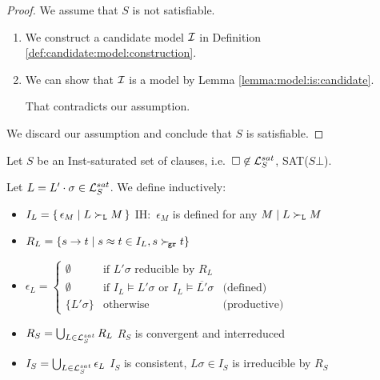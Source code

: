         \begin{proof} We assume that \(S\) is not satisfiable.
            \begin{enumerate}
                \item We construct a candidate model \(\mathcal{I}\) in Definition \vref{def:candidate:model:construction}.
                \item We can show that \(\mathcal{I}\) is a model by Lemma \vref{lemma:model:is:candidate}.

                That contradicts our assumption.
            \end{enumerate}
            We discard our assumption and conclude that \(S\) is satisfiable.
            \end{proof}

    \begin{definition}\label{def:candidate:model:construction}

        Let \(S\) be an Inst-saturated set of clauses,
        i.e.~\(\square\not\in\mathcal{L}_S^{sat}\), SAT(\(S\bot\)).

        Let \(L = L'\cdot\sigma \in\mathcal{L}_S^{sat}\).
        We define inductively:

            \begin{itemize}
                \item \(I_L = \{\,\epsilon_M\mid L\mathrel\succ_{\mathtt{L}} M\,\}\)
                \hfill  IH:~\(\epsilon_M\) is defined for any \(M\mid L\mathrel\succ_{\mathtt{L}} M\)

                \item \(R_L = \{ s \to t \mid s\approx t\in I_L, s\mathrel\succ_{\!\mathtt{gr}} t \}\)

                    \item \( \epsilon_L = \left\{
                        \begin{array}{cll}
                            \emptyset &\text{if }
                            L'\sigma\text{ reducible by }R_L
                            \\
                            \emptyset &\text{if }
                            I_L\vDash L'\sigma
                            \text{ or }
                            I_L\vDash \overline{L'}\sigma
                            &\text{(defined)}
                            \\
                            \{ L'\sigma \}
                            &\text{otherwise}
                            &\text{(productive)}
                        \end{array}
                    \right. \)

                \item
                \(R_S = \bigcup_{L\in\mathcal{L}_S^{sat}} R_L\)
                \hfill
                \(R_S\) is convergent and interreduced

                \item
                \(I_S = \bigcup_{L\in\mathcal{L}_S^{sat}} \epsilon_L\)
                \hfill
                \(I_S\) is consistent,
                \(L\sigma\in I_S\) is irreducible by \(R_S\)
            \end{itemize}
        \end{definition}

